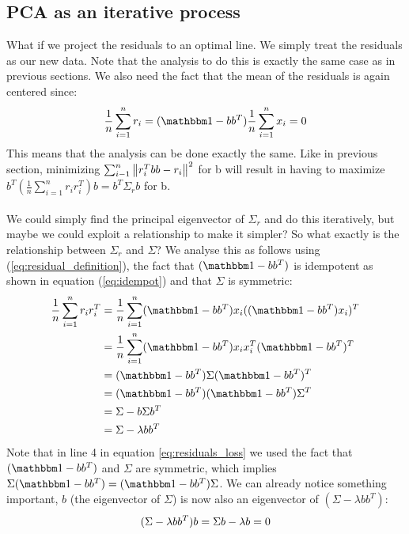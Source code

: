\subsection{PCA as an iterative process}
What if we project the residuals to an optimal line. 
We simply treat the residuals as our new data. Note that
the analysis to do this is exactly the same case as in 
previous sections. We also need the fact that the mean
of the residuals is again centered since:
\begin{equation}
\frac{1}{n}\sum_{i=1}^{n}r_i 
	= (\ID - bb^T)\frac{1}{n}\sum_{i=1}^{n}x_i = 0
\end{equation}
This means that the analysis can be done exactly the 
same. Like in previous section, minimizing $\sum_{i-1}^{n}
\left\lVert r_i^Tbb - r_i\right\rVert^2$ for b will result in having 
to maximize $b^T(\frac{1}{n}\sum_{i=1}^{n}r_ir_i^T)b 
= b^T\Sigma_rb$ for b. 
\\\\
We could simply find the principal eigenvector of 
$\Sigma_r $ and do this iteratively, but maybe we could 
exploit a relationship to make it simpler? So what exactly is the 
relationship between $\Sigma_r$ and $\Sigma$? We analyse 
this as follows using (\ref{eq:residual_definition}), the
fact that $(\ID - bb^T)$ is idempotent as shown in equation 
(\ref{eq:idempot}) and that $\Sigma$ is symmetric:
\begin{equation}
\label{eq:residuals_loss}
\begin{split}
\frac{1}{n}\sum_{i=1}^{n}r_ir_i^T 
	&= \frac{1}{n}\sum_{i=1}^{n}(\ID - bb^T)x_i((\ID - bb^T)x_i)^T\\
	&= \frac{1}{n}\sum_{i=1}^{n}(\ID - bb^T)x_ix_i^T(\ID - bb^T)^T\\
	&= (\ID - bb^T)\Sigma(\ID - bb^T)^T \\
	&= (\ID - bb^T)(\ID - bb^T)\Sigma^T \\	
	&= \Sigma - b\Sigma b^T\\
	&= \Sigma - \lambda bb^T			
\end{split}
\end{equation}
Note that in line 4 in equation \ref{eq:residuals_loss}
we used the fact that $(\ID - bb^T)$ and $\Sigma$ are symmetric, 
which implies $\Sigma (\ID - bb^T) = (\ID - bb^T) \Sigma$.
We can already notice something important, $b$ 
(the eigenvector of $\Sigma$) is now also an eigenvector
of $(\Sigma - \lambda bb^T)$:
\begin{equation}
(\Sigma - \lambda bb^T)b = \Sigma b - \lambda b = 0\\
\end{equation}

